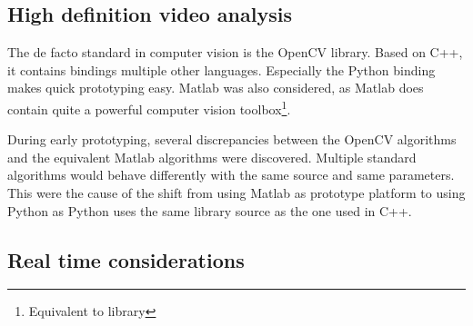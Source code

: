 \subsection{High definition video analysis}
The de facto standard in computer vision is the OpenCV library. Based on C++, it contains bindings multiple other languages. Especially 
the Python binding makes quick prototyping easy. Matlab was also considered, as Matlab does contain quite a powerful 
computer vision toolbox\footnote{Equivalent to library}.

During early prototyping, several discrepancies between the OpenCV algorithms 
 and the equivalent Matlab 
algorithms were discovered. Multiple standard algorithms would behave differently with the same source and same parameters. This 
were the cause of the shift from using Matlab as prototype platform to using Python as Python uses the same library source 
as the one used in C++.

\subsection{Real time considerations}

